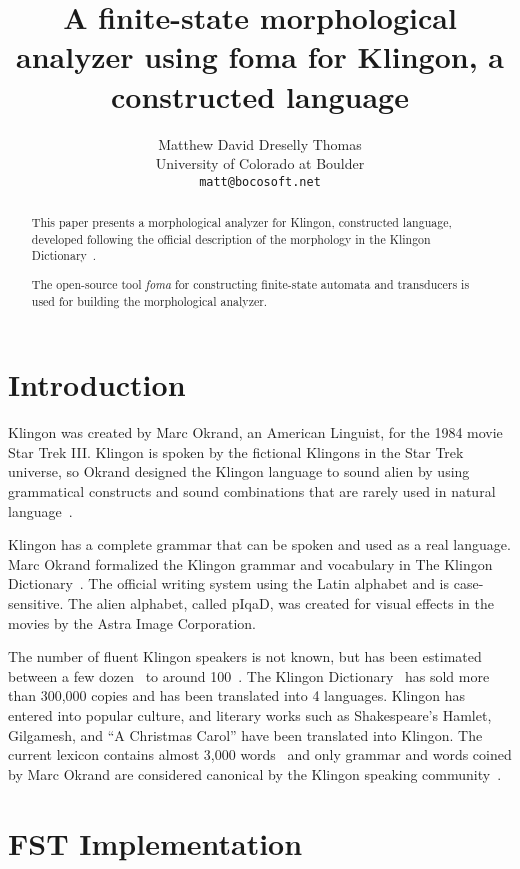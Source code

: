 \documentclass[11pt]{article}
\title{A finite-state morphological analyzer using foma for Klingon, a constructed language}
\author{Matthew David Dreselly Thomas \\
  University of Colorado at Boulder \\
  {\tt matt@bocosoft.net} \\}
\date{}
\begin{document}
\maketitle
\begin{abstract}
This paper presents a morphological analyzer for Klingon, constructed language, developed following the official description of the morphology in the Klingon Dictionary~\cite{Okrand:92}.

The open-source tool \textit{foma} for constructing finite-state automata and transducers is used for building the morphological analyzer.

\end{abstract}

\section{Introduction}

Klingon was created by Marc Okrand, an American Linguist, for the 1984 movie Star Trek III. Klingon is spoken by the fictional Klingons in the Star Trek universe, so Okrand designed the Klingon language to sound alien by using grammatical constructs and sound combinations that are rarely used in natural language~\cite{KLI:Development,KLI:Sounds}.

Klingon has a complete grammar that can be spoken and used as a real language. Marc Okrand formalized the Klingon grammar and vocabulary in The Klingon Dictionary~\cite{Okrand:92}. The official writing system using the Latin alphabet and is case-sensitive. The alien alphabet, called pIqaD, was created for visual effects in the movies by the Astra Image Corporation.

The number of fluent Klingon speakers is not known, but has been estimated between a few dozen~\cite{Okrent:09} to around 100~\cite{Kelly:13}. The Klingon Dictionary~\cite{Okrand:92} has sold more than 300,000 copies and has been translated into 4 languages. Klingon has entered into popular culture, and literary works such as Shakespeare's Hamlet, Gilgamesh, and ``A Christmas Carol'' have been translated into Klingon. The current lexicon contains almost 3,000 words~\cite{Zrajm:12} and only grammar and words coined by Marc Okrand are considered canonical by the Klingon speaking community~\cite{KLI:Canonical}.

\section{FST Implementation}
\end{document}
